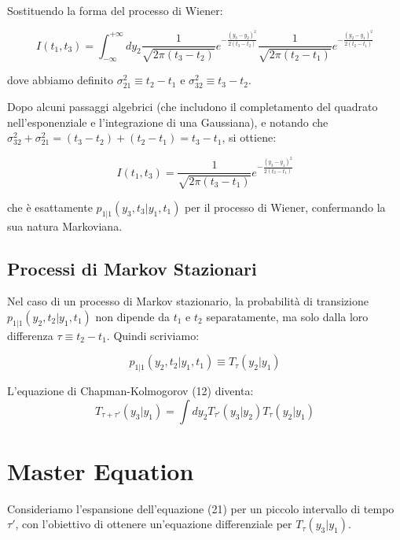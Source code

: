Sostituendo la forma del processo di Wiener:

\begin{equation}
I(t_1, t_3) = \int_{-\infty}^{+\infty} dy_2 \frac{1}{\sqrt{2\pi(t_3-t_2)}} e^{-\frac{(y_3-y_2)^2}{2(t_3-t_2)}} \frac{1}{\sqrt{2\pi(t_2-t_1)}} e^{-\frac{(y_2-y_1)^2}{2(t_2-t_1)}}
\end{equation}


dove abbiamo definito $\sigma_{21}^2 \equiv t_2 - t_1$ e $\sigma_{32}^2 \equiv t_3 - t_2$.

Dopo alcuni passaggi algebrici (che includono il completamento del quadrato nell'esponenziale e l'integrazione di una Gaussiana), e notando che $\sigma_{32}^2 + \sigma_{21}^2 = (t_3 - t_2) + (t_2 - t_1) = t_3 - t_1$, si ottiene:


\begin{equation}
I(t_1, t_3) = \frac{1}{\sqrt{2\pi(t_3-t_1)}} e^{-\frac{(y_3-y_1)^2}{2(t_3-t_1)}}
\end{equation}


che è esattamente $p_{1|1}(y_3, t_3 | y_1, t_1)$ per il processo di Wiener, confermando la sua natura Markoviana.

\subsection{ Processi di Markov Stazionari}

Nel caso di un processo di Markov stazionario, la probabilità di transizione $p_{1|1}(y_2, t_2 | y_1, t_1)$ non dipende da $t_1$ e $t_2$ separatamente, ma solo dalla loro differenza $\tau \equiv t_2 - t_1$. Quindi scriviamo:

\begin{equation}
p_{1|1}(y_2, t_2 | y_1, t_1) \equiv T_{\tau}(y_2 | y_1)
\end{equation}


L'equazione di Chapman-Kolmogorov (12) diventa:
\begin{equation}
T_{\tau+\tau'}(y_3 | y_1) = \int dy_2 T_{\tau'}(y_3 | y_2) T_{\tau}(y_2 | y_1)
\end{equation}

\section{Master Equation}

Consideriamo l'espansione dell'equazione (21) per un piccolo intervallo di tempo $\tau'$, con l'obiettivo di ottenere un'equazione differenziale per  $T_{\tau}(y_3 | y_1)$.


